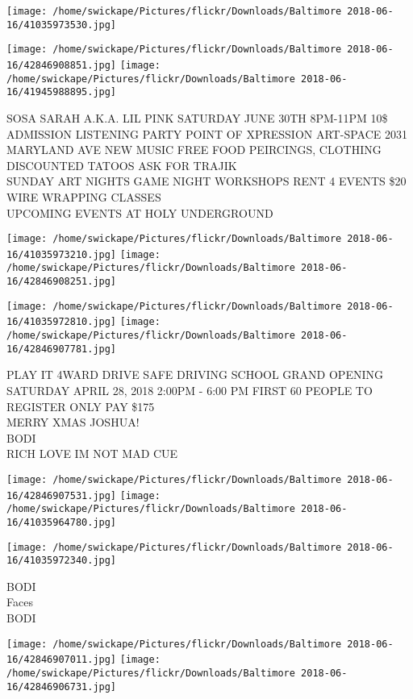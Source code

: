 \documentclass[10pt,letterpaper]{article}
\begin{document}
\texttt{[image: /home/swickape/Pictures/flickr/Downloads/Baltimore 2018-06-16/41035973530.jpg]}

\vspace{0.25in}
\texttt{[image: /home/swickape/Pictures/flickr/Downloads/Baltimore 2018-06-16/42846908851.jpg]}
\texttt{[image: /home/swickape/Pictures/flickr/Downloads/Baltimore 2018-06-16/41945988895.jpg]}

SOSA SARAH A.K.A. LIL PINK SATURDAY JUNE 30TH 8PM{-}11PM 10\$ ADMISSION LISTENING PARTY POINT OF XPRESSION ART{-}SPACE 2031 MARYLAND AVE NEW MUSIC FREE FOOD PEIRCINGS, CLOTHING DISCOUNTED TATOOS ASK FOR TRAJIK\\
SUNDAY ART NIGHTS GAME NIGHT WORKSHOPS RENT 4 EVENTS \$20 WIRE WRAPPING CLASSES\\
UPCOMING EVENTS AT HOLY UNDERGROUND
\pagebreak

\texttt{[image: /home/swickape/Pictures/flickr/Downloads/Baltimore 2018-06-16/41035973210.jpg]}
\texttt{[image: /home/swickape/Pictures/flickr/Downloads/Baltimore 2018-06-16/42846908251.jpg]}

\texttt{[image: /home/swickape/Pictures/flickr/Downloads/Baltimore 2018-06-16/41035972810.jpg]}
\texttt{[image: /home/swickape/Pictures/flickr/Downloads/Baltimore 2018-06-16/42846907781.jpg]}

PLAY IT 4WARD DRIVE SAFE DRIVING SCHOOL GRAND OPENING SATURDAY APRIL 28, 2018 2:00PM {-} 6:00 PM FIRST 60 PEOPLE TO REGISTER ONLY PAY \$175\\
MERRY XMAS JOSHUA!\\
BODI\\
RICH LOVE IM NOT MAD CUE
\pagebreak

\texttt{[image: /home/swickape/Pictures/flickr/Downloads/Baltimore 2018-06-16/42846907531.jpg]}
\texttt{[image: /home/swickape/Pictures/flickr/Downloads/Baltimore 2018-06-16/41035964780.jpg]}

\vspace{0.25in}
\texttt{[image: /home/swickape/Pictures/flickr/Downloads/Baltimore 2018-06-16/41035972340.jpg]}

BODI\\
Faces\\
BODI
\pagebreak

\texttt{[image: /home/swickape/Pictures/flickr/Downloads/Baltimore 2018-06-16/42846907011.jpg]}
\texttt{[image: /home/swickape/Pictures/flickr/Downloads/Baltimore 2018-06-16/42846906731.jpg]}
\end{document}
